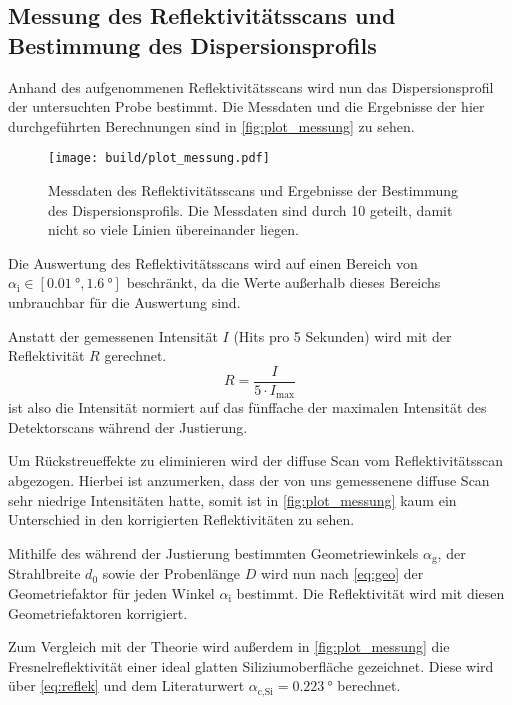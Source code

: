 \subsection{Messung des Reflektivitätsscans und Bestimmung des Dispersionsprofils}
\label{ssec:Messung}

Anhand des aufgenommenen Reflektivitätsscans wird nun das Dispersionsprofil der untersuchten Probe bestimmt.
Die Messdaten und die Ergebnisse der hier durchgeführten Berechnungen sind in \autoref{fig:plot_messung} zu sehen.

\begin{figure}
    \centering
    \texttt{[image: build/plot\_messung.pdf]}
    \caption{Messdaten des Reflektivitätsscans und Ergebnisse der Bestimmung des Dispersionsprofils. 
    Die Messdaten sind durch 10 geteilt, damit nicht so viele Linien übereinander liegen.} 
    \label{fig:plot_messung}
\end{figure}

Die Auswertung des Reflektivitätsscans wird auf einen Bereich von $\alpha_\text{i} \in [\SI{0.01}{\degree}, \SI{1.6}{\degree}]$ beschränkt,
da die Werte außerhalb dieses Bereichs unbrauchbar für die Auswertung sind.

Anstatt der gemessenen Intensität $I$ (Hits pro 5 Sekunden) wird mit der Reflektivität $R$ gerechnet.
\begin{equation}
    R = \frac{I}{5 \cdot I_\text{max}}
\end{equation}
ist also die Intensität normiert auf das fünffache der maximalen Intensität des Detektorscans während der Justierung.

Um Rückstreueffekte zu eliminieren wird der diffuse Scan vom Reflektivitätsscan abgezogen. 
Hierbei ist anzumerken, dass der von uns gemessenene diffuse Scan sehr niedrige Intensitäten hatte, 
somit ist in \autoref{fig:plot_messung} kaum ein Unterschied in den korrigierten Reflektivitäten zu sehen.

Mithilfe des während der Justierung bestimmten Geometriewinkels $\alpha_\text{g}$, der Strahlbreite $d_0$ sowie der Probenlänge $D$
wird nun nach \autoref{eq:geo} der Geometriefaktor für jeden Winkel $\alpha_\text{i}$ bestimmt.
Die Reflektivität wird mit diesen Geometriefaktoren korrigiert.

Zum Vergleich mit der Theorie wird außerdem in \autoref{fig:plot_messung} die Fresnelreflektivität einer ideal glatten Siliziumoberfläche gezeichnet.
Diese wird über \autoref{eq:reflek} und dem Literaturwert $\alpha_\text{c,Si} = \SI{0.223}{\degree}$ berechnet.\cite{V44old}

